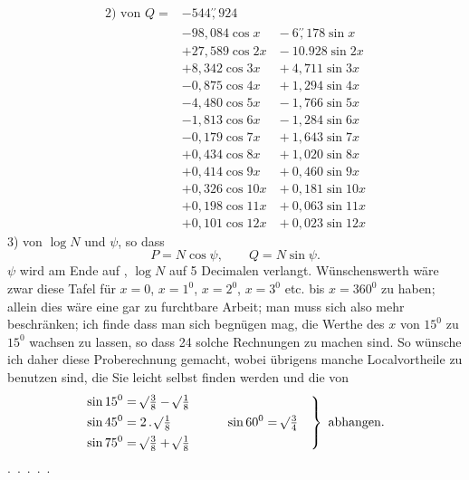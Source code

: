 \[
\begin{aligned}
\text{2) von }Q={}&-544\overset{\prime\prime}{,}924\\
&-98{,}084\cos x &{}-6\overset{\prime\prime}{,}178\sin x\\
&+27{,}589\cos2x &{}-10.928\sin2x\\
&+8{,}342\cos3x &{}+4{,}711\sin3x\\
&-0{,}875\cos4x &{}+1{,}294\sin4x\\
&-4{,}480\cos5x &{}-1{,}766\sin5x\\
&-1{,}813\cos6x &{}-1{,}284\sin6x\\
&-0{,}179\cos7x &{}+1{,}643\sin7x\\
&+0{,}434\cos8x &{}+1{,}020\sin8x\\
&+0{,}414\cos9x &{}+0{,}460\sin9x\\
&+0{,}326\cos10x &{}+0{,}181\sin10x\\
&+0{,}198\cos11x &{}+0{,}063\sin11x\\
&+0{,}101\cos12x &{}+0{,}023\sin12x
\end{aligned}
\]
\noindent\hspace*{\parindent}3) von \(\log N\) und \(\psi\), so dass
\[
P=N\cos\psi,\qquad Q=N\sin\psi.
\]
\noindent\(\psi\) wird am Ende auf , \(\log N\) auf 5 Decimalen verlangt. Wünschenswerth
wäre zwar diese Tafel für \(x=0\), \(x=1^0\), \(x=2^0\), \(x=3^0\) etc. bis
\(x=360^0\) zu haben; allein dies wäre eine gar zu furchtbare Arbeit; man
muss sich also mehr beschränken; ich finde dass  man sich begnügen
mag, die Werthe des \(x\) von \(15^0\) zu \(15^0\) wachsen zu lassen, so dass
24 solche Rechnungen zu machen sind. So wünsche ich daher diese Proberechnung
gemacht, wobei übrigens manche Localvortheile zu benutzen sind,
die Sie leicht selbst finden werden und die von
\[
\left.\begin{aligned}
\sin15^0&=\mathord{{}^{}\!\surd}\tfrac{3}{8}-\mathord{{}^{}\!\surd}\tfrac{1}{8}\\
\sin45^0&=2\,\mathord{.}\,\mathord{{}^{}\!\surd}\tfrac{1}{8}
&\qquad\sin60^0&=\mathord{{}^{}\!\surd}\tfrac{3}{4}\\
\sin75^0&=\mathord{{}^{}\!\surd}\tfrac{3}{8}+\mathord{{}^{}\!\surd}\tfrac{1}{8}
\end{aligned}\right\}\ \text{abhangen.}
\]
\noindent\hspace*{\parindent}.\ .\ .\ .\ .
\clearpage
\endgroup

